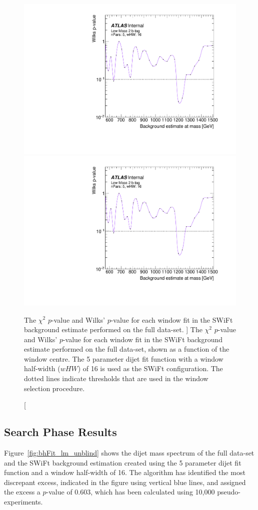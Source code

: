 \begin{figure}[!htb]
\captionsetup[subfigure]{aboveskip=0pt,justification=centering}
\centering
{} {
  \includegraphics[width=0.43\linewidth, angle=0,page=4]{figs/Dibjet/LowMass/FitStudy_min566/windowSel_unblind_just16.pdf}
}\hspace{-5mm}
 {
  \includegraphics[width=0.43\linewidth, angle=0,page=1]{figs/Dibjet/LowMass/FitStudy_min566/windowSel_unblind_just16.pdf}
}
\vspace{1pt}
\caption
    [ The  $\chi^{2}$ \mbox{$p$-value} and Wilks' \mbox{$p$-value} for each window fit in the SWiFt background estimate
      performed on the full \lm{} data-set.
    ]
    {\label{fig:windowSel_unblind_just16}
      The  $\chi^{2}$ \mbox{$p$-value} and Wilks' \mbox{$p$-value} for each window fit in the SWiFt background estimate
      performed on the full \lm{} data-set, shown as a function of the window centre.
      The 5 parameter dijet fit function with a window half-width ($wHW$) of 16 is used as the SWiFt configuration.
      The dotted lines indicate thresholds that are used in the window selection procedure.
}
\end{figure}

\FloatBarrier
\clearpage

\subsection{Search Phase Results}
\label{sec:bkg-full_results}

Figure~\ref{fig:bhFit_lm_unblind} shows the dijet mass spectrum of the full \lm{} data-set
and the SWiFt background estimation created using the 5 parameter dijet fit function and a window half-width of 16.
The \bh{} algorithm has identified the most discrepant excess, indicated in the figure using vertical blue lines,
and assigned the excess a \mbox{$p$-value} of 0.603, which has been calculated using 10,000 pseudo-experiments.

